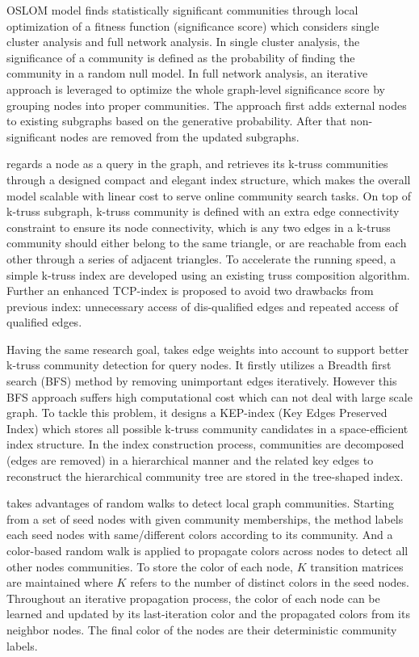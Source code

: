 OSLOM model \cite{lancichinetti2011finding} finds statistically significant communities through local optimization of a fitness function (significance score) which considers single cluster analysis and full network analysis. In single cluster analysis, the significance of a community is defined as the probability of finding the community in a random null model. In full network analysis, an iterative approach is leveraged to optimize the whole graph-level significance score by grouping nodes into proper communities. The approach first adds external nodes to existing subgraphs based on the generative probability. After that non-significant nodes are removed from the updated subgraphs.  

\cite{huang2014querying} regards a node as a query in the graph, and retrieves its k-truss communities through a designed compact and elegant index structure, which makes the overall model scalable with linear cost to serve online community search tasks.  On top of k-truss subgraph, k-truss community is defined with an extra edge connectivity constraint to ensure its node connectivity, which is any two edges in a k-truss community should either belong to the same triangle, or are reachable from each other through a series of adjacent triangles. To accelerate the running speed, a simple k-truss index are developed using an existing truss composition algorithm. Further an enhanced TCP-index is proposed to avoid two drawbacks from previous index: unnecessary access of dis-qualified edges and repeated access of qualified edges. 

Having the same research goal, \cite{zheng2017finding} takes edge weights into account to support better k-truss community detection for query nodes. It firstly utilizes a Breadth first search (BFS) method by removing unimportant edges iteratively. However this BFS approach suffers high computational cost which can not deal with large scale graph. To tackle this problem, it designs a KEP-index (Key Edges Preserved Index) which stores all possible k-truss community candidates in a space-efficient index structure. In the index construction process, communities are decomposed (edges are removed) in a hierarchical manner and the related key edges to reconstruct the hierarchical community tree are stored in the tree-shaped index. 

\cite{yan2019constrained} takes advantages of random walks to detect local graph communities. Starting from a set of seed nodes with given community memberships, the method labels each seed nodes with same/different colors according to its community. And a color-based random walk is applied to propagate colors across nodes to detect all other nodes communities. To store the color of each node, $K$ transition matrices are maintained where $K$ refers to the number of distinct colors in the seed nodes. Throughout an iterative propagation process, the color of each node can be learned and updated by its last-iteration color and the propagated colors from its neighbor nodes. The final color of the nodes are their deterministic community labels. 

